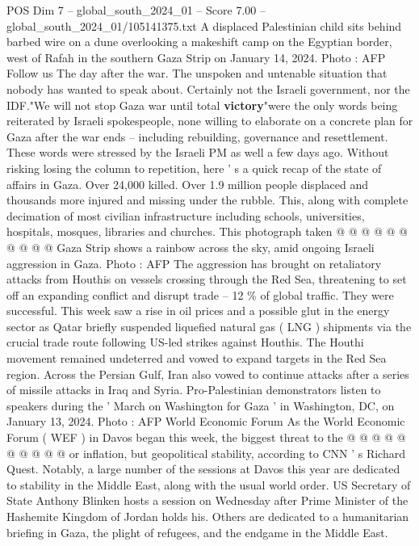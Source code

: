\begin{textsample}{POS Dim 7 – global\_south\_2024\_01 – Score 7.00 – global\_south\_2024\_01/105141375.txt}  \label{ex:f7_pos_309}
A displaced Palestinian child sits behind barbed wire on a dune overlooking a makeshift camp on the Egyptian border, west of Rafah in the southern Gaza Strip on January 14, 2024.
Photo : AFP Follow us The day after the war.
The unspoken and untenable situation that nobody has wanted to speak about.
Certainly not the Israeli government, nor the IDF."We will not stop Gaza war until total \textbf{victory}"were the only words being reiterated by Israeli spokespeople, none willing to elaborate on a concrete plan for Gaza after the war ends -- including rebuilding, governance and resettlement.
These words were stressed by the Israeli PM as well a few days ago.
Without risking losing the column to repetition, here ' s a quick recap of the state of affairs in Gaza.
Over 24,000 killed.
Over 1.9 million people displaced and thousands more injured and missing under the rubble.
This, along with complete decimation of most civilian infrastructure including schools, universities, hospitals, mosques, libraries and churches.
This photograph taken @ @ @ @ @ @ @ @ @ @ Gaza Strip shows a rainbow across the sky, amid ongoing Israeli aggression in Gaza.
Photo : AFP The aggression has brought on retaliatory attacks from Houthis on vessels crossing through the Red Sea, threatening to set off an expanding conflict and disrupt trade -- 12 \% of global traffic.
They were successful.
This week saw a rise in oil prices and a possible glut in the energy sector as Qatar briefly suspended liquefied natural gas ( LNG ) shipments via the crucial trade route following US-led strikes against Houthis.
The Houthi movement remained undeterred and vowed to expand targets in the Red Sea region.
Across the Persian Gulf, Iran also vowed to continue attacks after a series of missile attacks in Iraq and Syria.
Pro-Palestinian demonstrators listen to speakers during the ' March on Washington for Gaza ' in Washington, DC, on January 13, 2024.
Photo : AFP World Economic Forum As the World Economic Forum ( WEF ) in Davos began this week, the biggest threat to the @ @ @ @ @ @ @ @ @ @ or inflation, but geopolitical stability, according to CNN ' s Richard Quest.
Notably, a large number of the sessions at Davos this year are dedicated to stability in the Middle East, along with the usual world order.
US Secretary of State Anthony Blinken hosts a session on Wednesday after Prime Minister of the Hashemite Kingdom of Jordan holds his.
Others are dedicated to a humanitarian briefing in Gaza, the plight of refugees, and the endgame in the Middle East.

\end{textsample}
